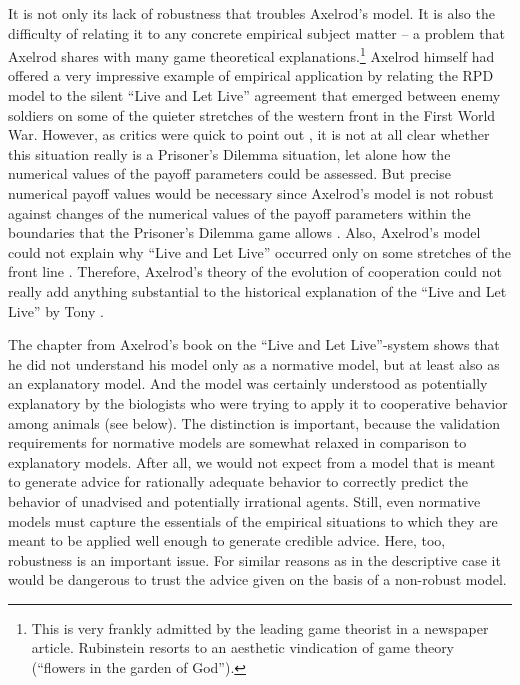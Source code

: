 \documentclass[12pt, english, a4paper]{article}
\begin{document}
It is not only its lack of robustness that troubles Axelrod’s
model. It is also the difficulty of relating it to any concrete
empirical subject matter – a problem that Axelrod shares with many
game theoretical explanations.\footnote{This is very frankly admitted
  by the leading game theorist \citet{rubinstein:2013} in a newspaper
  article. Rubinstein resorts to an aesthetic vindication of game
  theory (“flowers in the garden of God”).}  Axelrod himself had
offered a very impressive example of empirical application by relating
the RPD model to the silent “Live and Let Live” agreement that emerged
between enemy soldiers on some of the quieter stretches of the western
front in the First World War. However, as critics were quick to point
out \citep{battermann-et-al:1998, schuessler:1990}, it is not at all
clear whether this situation really is a Prisoner’s Dilemma situation,
let alone how the numerical values of the payoff parameters could be
assessed. But precise numerical payoff values would be necessary since
Axelrod’s model is not robust against changes of the numerical values
of the payoff parameters within the boundaries that the Prisoner’s
Dilemma game allows \citep[80]{arnold:2008}. Also, Axelrod’s model
could not explain why “Live and Let Live” occurred only on some
stretches of the front line \citep[180]{arnold:2008}. Therefore,
Axelrod’s theory of the evolution of cooperation could not really add
anything substantial to the historical explanation of the “Live and
Let Live” by Tony \citet{ashworth:1980}.

The chapter from Axelrod’s book on the “Live and Let Live”-system
shows that he did not understand his model only as a normative model,
but at least also as an explanatory model. And the model was certainly
understood as potentially explanatory by the biologists who were
trying to apply it to cooperative behavior among animals (see
below). The distinction is important, because the validation
requirements for normative models are somewhat relaxed in comparison
to explanatory models. After all, we would not expect from a model
that is meant to generate advice for rationally adequate behavior to
correctly predict the behavior of unadvised and potentially irrational
agents. Still, even normative models must capture the essentials of
the empirical situations to which they are meant to be applied well
enough to generate credible advice. Here, too, robustness is an
important issue. For similar reasons as in the descriptive case it
would be dangerous to trust the advice given on the basis of a
non-robust model.
\end{document}
